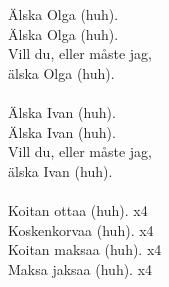
            Älska Olga (huh). \\
            Älska Olga (huh). \\
            Vill du, eller måste jag, \\
            älska Olga (huh). \\
\hspace{10mm} \\
            Älska Ivan (huh). \\
            Älska Ivan (huh). \\
            Vill du, eller måste jag, \\
            älska Ivan (huh). \\
\hspace{10mm} \\
            Koitan ottaa (huh). x4 \\
            Koskenkorvaa (huh). x4 \\
            Koitan maksaa (huh). x4 \\
            Maksa jaksaa (huh). x4 \\
